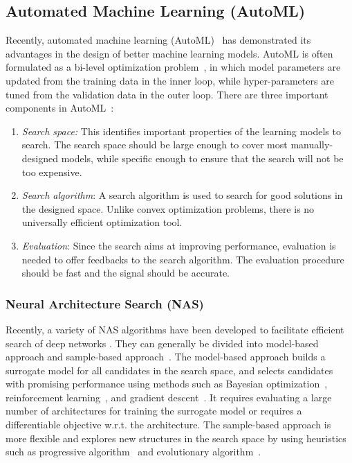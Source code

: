 \documentclass[10pt,journal,compsoc]{IEEEtran}
\begin{document}
\subsection{Automated Machine Learning (AutoML)}
\label{sec:automl}

Recently,
automated machine learning (AutoML)~\cite{automl_book,quanming2018auto}
has 
demonstrated its advantages
in the design of better machine learning models.
AutoML is often formulated as a bi-level optimization
problem~\cite{colson2007overview}, in which
model parameters 
are updated
from the training data in the inner loop, while
hyper-parameters are tuned from the validation data in the outer loop.
There are three important components
in AutoML~\cite{automl_book,quanming2018auto,bender2018understanding}:
\begin{enumerate}[leftmargin=10.9px]
	\item
	\textit{Search space:}
This identifies important properties of the learning models to search.
The search space should be large enough to cover most manually-designed models,
while specific enough to ensure that the search will not be too expensive.
	
\item \textit{Search algorithm}: 
A search algorithm is used to search for good solutions in the designed space.  
Unlike convex optimization problems, there is no universally efficient optimization tool.

\item \textit{Evaluation}: 
Since the search aims at improving performance, evaluation is needed 
to offer feedbacks to the search algorithm.
The evaluation procedure should be fast and the signal should be accurate.
\end{enumerate}



\subsubsection{Neural Architecture Search (NAS)}
\label{ssec:nas}

Recently, 
a variety of NAS algorithms have been developed to facilitate efficient search
of deep networks
\cite{elsken2019neural,automl_book,zoph2017neural}.
They can generally be divided into 
model-based approach and sample-based approach~\cite{quanming2018auto}.
The model-based approach builds a surrogate model for all candidates in the
search space,
and selects candidates with promising performance
using methods such as 
Bayesian optimization~\cite{feurer2015efficient},
reinforcement learning~\cite{zoph2017neural,pham2018efficient},
and gradient descent~\cite{liu2018darts,yao2019differentiable}.
It requires evaluating a large number of architectures 
for training the surrogate model
or requires a differentiable objective w.r.t. the architecture.
The sample-based approach
is more flexible and
explores new structures
in the search space 
by using heuristics
such as 
progressive algorithm~\cite{liu2018progressive} 
and evolutionary algorithm~\cite{real2019regularized}.
\end{document}
